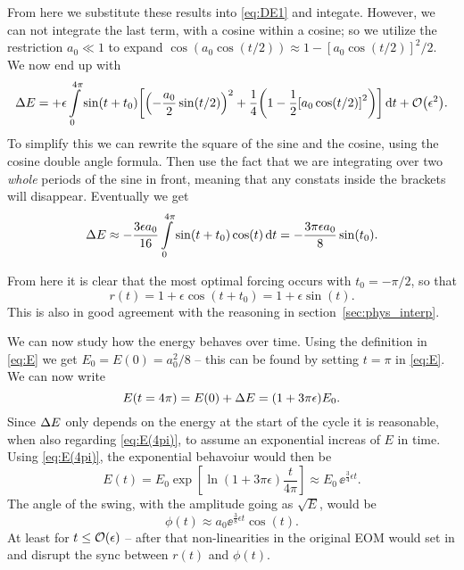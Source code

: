 \documentclass[11pt,letter, swedish, english
]{article}
\begin{document}
From here we substitute these results into \eqref{eq:DE1} and
integate. However, we can not integrate the last term, with a cosine
within a cosine; so we utilize the restriction $a_0\ll1$ to expand
$\cos(a_0\cos(t/2))\approx1-[a_0\cos(t/2)]^2/2$. We now end up with
\begin{equation}
\DE=+\epsilon\int_0^{4\pi}\sin(t+t_0)
\qty[\qty(-\frac{a_0}{2}\sin(t/2))^2
+\frac{1}{4}\qty(1-\frac{1}{2}\qty[a_0\cos(t/2)]^2)
]\id{t}+\order{\epsilon^2}.
\end{equation}
To simplify this we can rewrite the square of the sine and the cosine,
using the cosine double angle formula. Then use the fact that we are
integrating over two \emph{whole} periods of the sine in front,
meaning that any constats inside the brackets will
disappear. Eventually we get
\begin{equation}
\DE\approx
-\frac{3\epsilon a_0}{16}\int_0^{4\pi}\sin(t+t_0)\cos(t)\id{t}
=-\frac{3\pi\epsilon a_0}{8}\sin(t_0).
\end{equation}

From here it is clear that the most optimal forcing occurs with
$t_0=-\pi/2$, so that
\begin{equation}
r(t)=1+\epsilon\cos(t+t_0)=1+\epsilon\sin(t).
\end{equation}
This is also in good agreement with the reasoning in
section~\ref{sec:phys_interp}.

We can now study how the energy behaves over time. Using the
definition in \eqref{eq:E} we get $E_0=E(0)=a_0^2/8$ -- this can be
found by setting $t=\pi$ in \eqref{eq:E}. We can now write
\begin{equation}\label{eq:E(4pi)}
E(t=4\pi)=E(0)+\Delta{E}=(1+3\pi\epsilon)E_0.
\end{equation}
Since $\Delta{E}$ only depends on the energy at the start of the cycle it is
reasonable, when also regarding \eqref{eq:E(4pi)}, to assume an
exponential increas of $E$ in time. Using \eqref{eq:E(4pi)}, the
exponential behavoiur would then be
\begin{equation}
E(t)=E_0\exp[\ln(1+3\pi\epsilon)\frac{t}{4\pi}]
\approx E_0\,\ee^{\frac{3}{4}\epsilon t}.
\end{equation}
The angle of the swing, with the amplitude going as
$\sqrt{E}$, would be 
\begin{equation}\label{eq:phi_from_E}
\phi(t)\approx a_0\ee^{\frac{3}{8}\epsilon t}\cos(t).
\end{equation}
At least for $t\le\order{\epsilon}$ -- after that non-linearities in the
original EOM would set in and disrupt the sync between $r(t)$ and
$\phi(t)$. 
\end{document}
